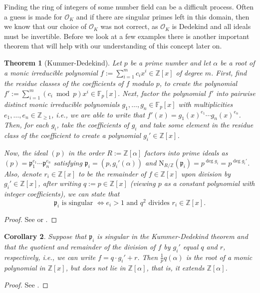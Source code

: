 \documentclass[openany, a4paper, 10pt]{book}
\theoremstyle{plain}
\newtheorem{theorem}{Theorem}[chapter]
\theoremstyle{plain}
\theoremstyle{plain}
\theoremstyle{definition}
\theoremstyle{plain}
\newtheorem{corollary}[theorem]{Corollary}
\theoremstyle{definition}
\theoremstyle{remark}
\begin{document}
Finding the ring of integers of some number field can be a difficult process.
Often a guess is made for $\mathcal O_K$ and if there are singular primes left in this domain, then we know that our choice of $\mathcal O_K$ was not correct, as $\mathcal O_K$ is Dedekind and all ideals must be invertible.
Before we look at a few examples there is another important theorem that will help with our understanding of this concept later on.

\begin{theorem}[Kummer-Dedekind]\label{kummer_dedekind}
    Let $p$ be a prime number and let $\alpha$ be a root of a monic irreducible polynomial $f:= \sum_{i=1}^m c_i x^i \in \mathbb Z[x]$ of degree $m$.
    First, find the residue classes of the coefficients of $f$ modulo $p$, to create the polynomial $f' := \sum_{i=1}^m (c_i \bmod p) x^i \in \mathbb F_p[x]$.
    Next, factor the polynomial $f'$ into pairwise distinct monic irreducible polynomials $g_1, \dots, g_n \in \mathbb F_p[x]$ with multiplicities $e_1, \dots, e_n \in \mathbb Z_{\geq 1}$, i.e., we are able to write that $f'(x) = g_1(x)^{e_1} \cdots g_n(x)^{e_n}$.
    Then, for each $g_i$, take the coefficients of $g_i$ and take some element in the residue class of the coefficient to create a polynomial $g_i' \in \mathbb Z[x]$.

    Now, the ideal $(p)$ in the order $R:=\mathbb Z[\alpha]$ factors into prime ideals as
    $(p) = \mathfrak p_1^{e_1} \cdots \mathfrak p_n^{e_n}$
    satisfying $\mathfrak p_i = (p, g_i'(\alpha))$
    and $\mathrm{N}_{R / \mathbb Z}(\mathfrak p_i) = p^{\deg g_i} = p^{\deg g_i'}$.
    Also, denote $r_i \in \mathbb Z[x]$ to be the remainder of $f \in \mathbb Z[x]$ upon division by $g_i' \in \mathbb Z[x]$, after writing $q := p\in \mathbb Z[x]$ (viewing $p$ as a constant polynomial with integer coefficients), we can state that
    \begin{equation*}
        \mathfrak p_i \textrm{ is singular } \iff e_i > 1 \textrm{ and } q^2 \textrm{ divides } r_i \in \mathbb Z[x].
    \end{equation*}
\end{theorem}
\begin{proof}
    See \cite{dedekind} or \cite[Theorem~3.1]{ANT_dictaat}.
\end{proof}

\begin{corollary}\label{extension}
    Suppose that $\mathfrak p_i$ is singular in the Kummer-Dedekind theorem and that the quotient and remainder of the division of $f$ by $g_i'$ equal $q$ and $r$, respectively, i.e., we can write $f = q \cdot g_i' + r$.
    Then $\frac{1}{p} q(\alpha)$ is the root of a monic polynomial in $\mathbb Z[x]$, but does not lie in $\mathbb Z[\alpha]$, that is, it extends $\mathbb Z[\alpha]$.
\end{corollary}
\begin{proof}
    See \cite[Theorems~3.1,3.2]{ANT_dictaat}.
\end{proof}
\end{document}
